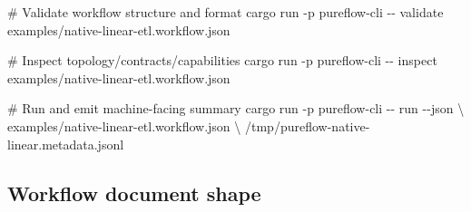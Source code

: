 \documentclass[
  letterpaper,
]{report}
\newenvironment{Shaded}{\begin{snugshade}}{\end{snugshade}}
\newcommand{\AttributeTok}[1]{\textcolor[rgb]{0.40,0.45,0.13}{#1}}
\newcommand{\CommentTok}[1]{\textcolor[rgb]{0.37,0.37,0.37}{#1}}
\newcommand{\DataTypeTok}[1]{\textcolor[rgb]{0.68,0.00,0.00}{#1}}
\newcommand{\ExtensionTok}[1]{\textcolor[rgb]{0.00,0.23,0.31}{#1}}
\newcommand{\NormalTok}[1]{\textcolor[rgb]{0.00,0.23,0.31}{#1}}
\begin{document}
\begin{Shaded}
\begin{Highlighting}[]
\CommentTok{\# Validate workflow structure and format}
\ExtensionTok{cargo}\NormalTok{ run }\AttributeTok{{-}p}\NormalTok{ pureflow{-}cli }\AttributeTok{{-}{-}}\NormalTok{ validate examples/native{-}linear{-}etl.workflow.json}

\CommentTok{\# Inspect topology/contracts/capabilities}
\ExtensionTok{cargo}\NormalTok{ run }\AttributeTok{{-}p}\NormalTok{ pureflow{-}cli }\AttributeTok{{-}{-}}\NormalTok{ inspect examples/native{-}linear{-}etl.workflow.json}

\CommentTok{\# Run and emit machine{-}facing summary}
\ExtensionTok{cargo}\NormalTok{ run }\AttributeTok{{-}p}\NormalTok{ pureflow{-}cli }\AttributeTok{{-}{-}}\NormalTok{ run }\AttributeTok{{-}{-}json} \DataTypeTok{\textbackslash{}}
\NormalTok{  examples/native{-}linear{-}etl.workflow.json }\DataTypeTok{\textbackslash{}}
\NormalTok{  /tmp/pureflow{-}native{-}linear.metadata.jsonl}
\end{Highlighting}
\end{Shaded}

\subsection{Workflow document shape}\label{workflow-document-shape}
\end{document}
